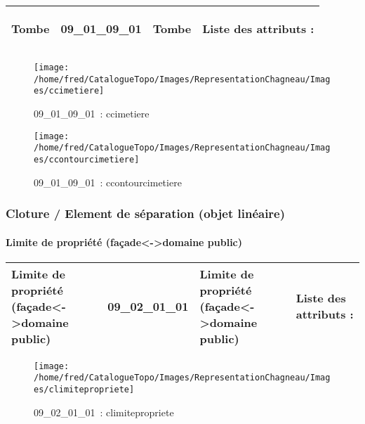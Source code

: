 \documentclass[12pt,titlepage]{book}
\begin{document}
\renewcommand{\arraystretch}{1.2}
\begin{supertabular}{|p{10cm}|c|p{13cm}|p{12cm}|}
 Tombe & 09\_01\_09\_01 & Tombe & Liste des attributs :
\begin{enumerate}
\end{enumerate}
\\
\hline
\end{supertabular}
\begin{figure}[h!]
  \hfill         %
  \begin{minipage}[t]{3cm}
    \begin{center}
      \texttt{[image: /home/fred/CatalogueTopo/Images/RepresentationChagneau/Images/ccimetiere]}
      \caption[~09\_01\_09\_01]{\small{09\_01\_09\_01~:} \tiny{ccimetiere}}\label{ccimetiere}
    \end{center}
  \end{minipage}
  \begin{minipage}[t]{3cm}
    \begin{center}
      \texttt{[image: /home/fred/CatalogueTopo/Images/RepresentationChagneau/Images/ccontourcimetiere]}
      \caption[~09\_01\_09\_01]{\small{09\_01\_09\_01~:} \tiny{ccontourcimetiere}}\label{ccontourcimetiere}
    \end{center}
  \end{minipage}
\end{figure}

\subsubsection{\large Cloture / Element de séparation (objet linéaire)}
\paragraph{Limite de propriété (façade<->domaine public)}
\noindent
\vspace{\baselineskip}

\renewcommand{\arraystretch}{1.2}
\begin{supertabular}{|p{10cm}|c|p{13cm}|p{12cm}|}
 Limite de propriété (façade<->domaine public) & 09\_02\_01\_01 & Limite de propriété (façade<->domaine public) & Liste des attributs :
\begin{enumerate}
\end{enumerate}
\\
\hline
\end{supertabular}
\begin{figure}[h!]
  \hfill         %
  \begin{minipage}[t]{3cm}
    \begin{center}
      \texttt{[image: /home/fred/CatalogueTopo/Images/RepresentationChagneau/Images/climitepropriete]}
      \caption[~09\_02\_01\_01]{\small{09\_02\_01\_01~:} \tiny{climitepropriete}}\label{climitepropriete}
    \end{center}
  \end{minipage}
\end{figure}
\end{document}
